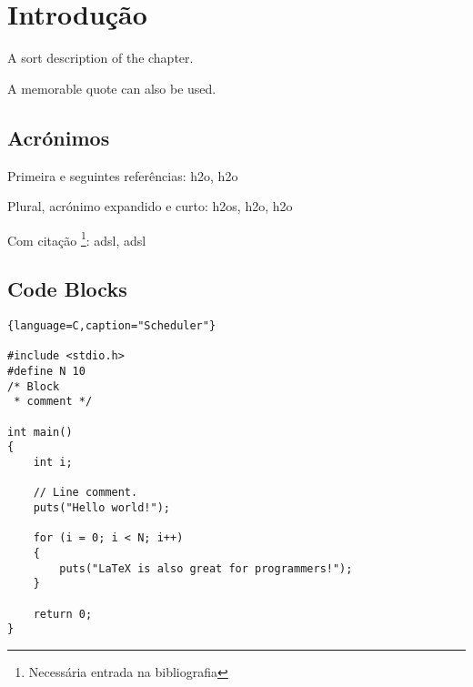 

\chapter{Introdu\c cão}
\label{chapter:introduction}

\begin{introduction}
A sort description of the chapter.

A memorable quote can also be used.
\end{introduction}



\section{Acrónimos}

Primeira e seguintes referências: \ac{h2o}, \ac{h2o}

Plural, acrónimo expandido e curto: \acp{h2o}, \acs{h2o}, \acl{h2o}

Com citação \footnote{Necessária entrada na bibliografia}: \ac{adsl}, \ac{adsl}


\section{Code Blocks}

\begin{lstlisting}{language=C,caption="Scheduler"}

#include <stdio.h>
#define N 10
/* Block
 * comment */
 
int main()
{
    int i;
 
    // Line comment.
    puts("Hello world!");
 
    for (i = 0; i < N; i++)
    {
        puts("LaTeX is also great for programmers!");
    }
 
    return 0;
}
\end{lstlisting}
 



